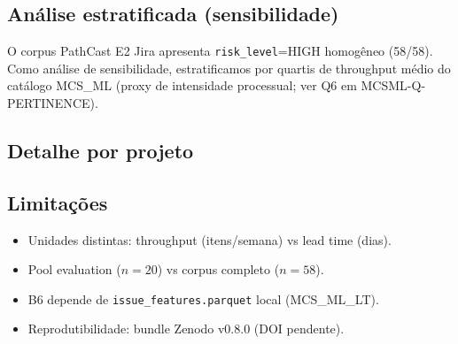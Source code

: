 \subsection{Análise estratificada (sensibilidade)}
\label{sec:e2c-stratified}

O corpus PathCast E2 Jira apresenta \texttt{risk\_level}=HIGH homogêneo (58/58).
Como análise de sensibilidade, estratificamos por quartis de throughput médio do
catálogo MCS\_ML (proxy de intensidade processual; ver Q6 em MCSML-Q-PERTINENCE).



\subsection{Detalhe por projeto}
\label{sec:e2c-per-project}



\subsection{Limitações}
\label{sec:e2c-limitations}

\begin{itemize}
  \item Unidades distintas: throughput (itens/semana) vs lead time (dias).
  \item Pool evaluation ($n=20$) vs corpus completo ($n=58$).
  \item B6 depende de \texttt{issue\_features.parquet} local (MCS\_ML\_LT).
  \item Reprodutibilidade: bundle Zenodo v0.8.0 (DOI pendente).
\end{itemize}
